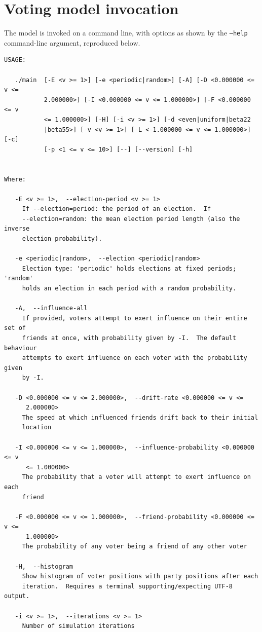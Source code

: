 \documentclass[12pt]{article}
\numberwithin{equation}{subsection}
\begin{document}
\section{Voting model invocation}\label{app:mainhelp}

The model is invoked on a command line, with options as shown by the \texttt{--help} command-line
argument, reproduced below.

{\footnotesize\begin{Verbatim}
USAGE: 

   ./main  [-E <v >= 1>] [-e <periodic|random>] [-A] [-D <0.000000 <= v <=
           2.000000>] [-I <0.000000 <= v <= 1.000000>] [-F <0.000000 <= v
           <= 1.000000>] [-H] [-i <v >= 1>] [-d <even|uniform|beta22
           |beta55>] [-v <v >= 1>] [-L <-1.000000 <= v <= 1.000000>] [-c]
           [-p <1 <= v <= 10>] [--] [--version] [-h]


Where: 

   -E <v >= 1>,  --election-period <v >= 1>
     If --election=period: the period of an election.  If
     --election=random: the mean election period length (also the inverse
     election probability).

   -e <periodic|random>,  --election <periodic|random>
     Election type: 'periodic' holds elections at fixed periods; 'random'
     holds an election in each period with a random probability.

   -A,  --influence-all
     If provided, voters attempt to exert influence on their entire set of
     friends at once, with probability given by -I.  The default behaviour
     attempts to exert influence on each voter with the probability given
     by -I.

   -D <0.000000 <= v <= 2.000000>,  --drift-rate <0.000000 <= v <=
      2.000000>
     The speed at which influenced friends drift back to their initial
     location

   -I <0.000000 <= v <= 1.000000>,  --influence-probability <0.000000 <= v
      <= 1.000000>
     The probability that a voter will attempt to exert influence on each
     friend

   -F <0.000000 <= v <= 1.000000>,  --friend-probability <0.000000 <= v <=
      1.000000>
     The probability of any voter being a friend of any other voter

   -H,  --histogram
     Show histogram of voter positions with party positions after each
     iteration.  Requires a terminal supporting/expecting UTF-8 output.

   -i <v >= 1>,  --iterations <v >= 1>
     Number of simulation iterations


\end{Verbatim}}
\end{document}
